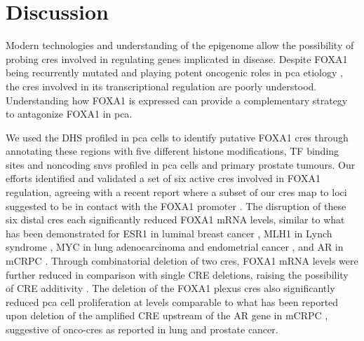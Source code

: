 \section{Discussion}

Modern technologies and understanding of the epigenome allow the possibility of probing \glspl{cre} involved in regulating genes implicated in disease.
Despite FOXA1 being recurrently mutated \cite{abeshouseMolecularTaxonomyPrimary2015,fraserGenomicHallmarksLocalized2017,barbieriExomeSequencingIdentifies2012,grassoMutationalLandscapeLethal2012,robinsonIntegrativeClinicalGenomics2015} and playing potent oncogenic roles in \gls{pca} etiology \cite{paroliaDistinctStructuralClasses2019,adamsFOXA1MutationsAlter2019,gaoForkheadDomainMutations2019}, the \glspl{cre} involved in its transcriptional regulation are poorly understood.
Understanding how FOXA1 is expressed can provide a complementary strategy to antagonize FOXA1 in \gls{pca}.

We used the DHS profiled in \gls{pca} cells to identify putative FOXA1 \glspl{cre} through annotating these regions with five different histone modifications, TF binding sites and noncoding \glspl{snv} profiled in \gls{pca} cells and primary prostate tumours.
Our efforts identified and validated a set of six active \glspl{cre} involved in FOXA1 regulation, agreeing with a recent report where a subset of our \glspl{cre} map to loci suggested to be in contact with the FOXA1 promoter \cite{rhieHighresolution3DEpigenomic2019}.
The disruption of these six distal \glspl{cre} each significantly reduced FOXA1 mRNA levels, similar to what has been demonstrated for ESR1 in luminal breast cancer \cite{baileyNoncodingSomaticInherited2016}, MLH1 in Lynch syndrome \cite{liuDisruption35Kb2018}, MYC in lung adenocarcinoma and endometrial cancer \cite{zhangIdentificationFocallyAmplified2016}, and AR in mCRPC \cite{takedaSomaticallyAcquiredEnhancer2018,viswanathanStructuralAlterationsDriving2018}.
Through combinatorial deletion of two \glspl{cre}, FOXA1 mRNA levels were further reduced in comparison with single CRE deletions, raising the possibility of CRE additivity \cite{osterwalderEnhancerRedundancyProvides2018}.
The deletion of the FOXA1 plexus \glspl{cre} also significantly reduced \gls{pca} cell proliferation at levels comparable to what has been reported upon deletion of the amplified CRE upstream of the AR gene in mCRPC \cite{takedaSomaticallyAcquiredEnhancer2018}, suggestive of onco-\glspl{cre} as reported in lung \cite{zhangIdentificationFocallyAmplified2016} and prostate \cite{takedaSomaticallyAcquiredEnhancer2018} cancer.

